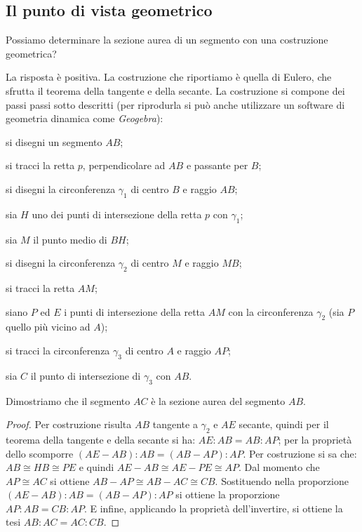 \subsection{Il punto di vista geometrico}

Possiamo determinare la sezione aurea di un segmento con una costruzione geometrica?

La risposta è positiva. La costruzione che riportiamo è quella di Eulero, che sfrutta il teorema della tangente e della secante.
La costruzione si compone dei passi passi sotto descritti (per riprodurla si può anche utilizzare un software di geometria dinamica come \emph{Geogebra}):
\begin{enumerate*}
\item si disegni un segmento $AB$;
\item si tracci la retta $p$, perpendicolare ad $AB$ e passante per $B$;
\item si disegni la circonferenza $\gamma_1$ di centro $B$ e raggio $AB$;
\item sia $H$ uno dei punti di intersezione della retta $p$ con $\gamma_1$;
\item sia $M$ il punto medio di $BH$;
\item si disegni la circonferenza $\gamma_2$ di centro $M$ e raggio $MB$;
\item si tracci la retta $AM$;
\item siano $P$ ed $E$ i punti di intersezione della retta $AM$ con la circonferenza $\gamma_2$ (sia $P$ quello più vicino ad $A$);
\item si tracci la circonferenza $\gamma_3$ di centro $A$ e raggio $AP$;
\item sia $C$ il punto di intersezione di $\gamma_3$ con $AB$.
\end{enumerate*}

Dimostriamo che il segmento $AC$ è la sezione aurea del segmento $AB$.
\begin{proof}
Per costruzione risulta $AB$ tangente a $\gamma_2$ e $AE$ secante, quindi per il teorema della tangente e della secante si ha: $AE : AB = AB : AP$; per la proprietà dello scomporre $(AE-AB):AB=(AB-AP):AP$.
Per costruzione si sa che: $AB\cong HB\cong PE$ e quindi $AE - AB \cong AE - PE\cong AP$.
Dal momento che $AP\cong AC$ si ottiene $AB - AP \cong AB - AC \cong CB$.
Sostituendo nella proporzione $(AE-AB):AB=(AB-AP):AP$ si ottiene la proporzione $AP : AB = CB : AP$.
E infine, applicando la proprietà dell'invertire, si ottiene la tesi $AB : AC = AC : CB$.
\end{proof}

